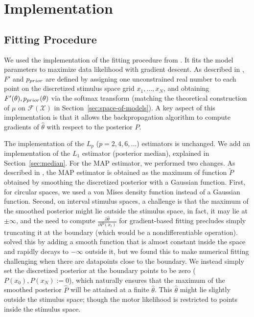 



\section{Implementation}

\subsection{Fitting Procedure}

We used the implementation of the fitting procedure from \citet{hahn2024unifying}.
It fits the model parameters to maximize data likelihood with gradient descent.
As described in \citet{hahn2024unifying}, $F'$ and $p_{prior}$ are defined by assigning one unconstrained real number to each point on the discretized stimulus space grid $x_1, \dots, x_N$, and obtaining $F'(\theta), p_{prior}(\theta)$ via the softmax transform (matching the theoretical construction of $\mu$ on $\mathcal{F}(\mathcal{X})$ in Section~\ref{sec:space-of-models}).
A key aspect of this implementation is that it allows the backpropagation algorithm to compute gradients of $\widehat{\theta}$ with respect to the posterior $P$.

The implementation of the $L_p$ ($p=2,4,6,\dots$) estimators is unchanged.
We add an implementation of the $L_1$ estimator (posterior median), explained in Section~\ref{sec:median}.
For the MAP estimator, we performed two changes.
As described in \citet{hahn2024unifying}, the MAP estimator is obtained as the maximum of function $\tilde{P}$ obtained by smoothing the discretized posterior with a Gaussian function.
First, for circular spaces, we used a von Mises density function instead of a Gaussian function.
Second, on interval stimulus spaces, a challenge is that the maximum of the smoothed posterior might lie outside the stimulus space, in fact, it may lie at $\pm \infty$, and the need to compute $\frac{\partial \widehat{\theta}}{\partial P(x_i)}$ for gradient-based fitting precludes simply truncating it at the boundary (which would be a nondifferentiable operation). \citet{hahn2024unifying} solved this by adding a smooth function that is almost constant inside the space and rapidly decays to $-\infty$ outside it, but we found this to make numerical fitting challenging when there are datapoints close to the boundary.
We instead simply set the discretized posterior at the boundary points to be zero ($P(x_0), P(x_N) := 0$), which naturally ensures that the maximum of the smoothed posterior $\widehat{P}$ will be attained at a finite $\widehat{\theta}$. This $\widehat{\theta}$ might lie slightly outside the stimulus space; though the motor likelihood is restricted to points inside the stimulus space.


